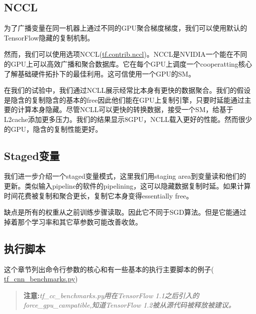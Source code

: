\subsection{NCCL}
为了广播变量在同一机器上通过不同的GPU聚合梯度梯度，我们可以使用默认的TensorFlow隐藏的复制机制。

然而，我们可以使用选项NCCL(\href{https://www.tensorflow.org/api_docs/python/tf/contrib/nccl}{tf.contrib.nccl})。NCCL是NVIDIA一个能在不同的GPU上可以高效广播和聚合数据库。它在每个GPU上调度一个cooperatting核心了解基础硬件拓扑下的最佳利用。这可信使用一个GPU的SM。

在我们的试验中，我们通过NCLL展示经常比本身有更快的数据聚合。我们的假设是隐含的复制隐含的基本的free因此他们能在GPU上复制引擎，只要时延能通过主要的计算本身隐藏。尽管NCLL可以更快的转换数据，接受一个SM，给基于L2cache添加更多压力。我们的结果显示8GPU，NCLL载入更好的性能。然而很少的GPU，隐含的复制性能更好。
\subsection{Staged变量}
我们进一步介绍一个staged变量模式，这里我们用staging area到变量读和他们的更新。类似输入pipeline的软件的pipelining，这可以隐藏数据复制时延。如果计算时间花费被复制和聚合更长，复制它本身变得essentially free。

缺点是所有的权重从之前训练步骤读取。因此它不同于SGD算法。但是它能通过掉着那个学习率和其它草参数可能改善收敛。

\subsection{执行脚本}
这个章节列出命令行参数的核心和有一些基本的执行主要脚本的例子( \href{https://github.com/tensorflow/benchmarks/tree/master/scripts/tf_cnn_benchmarks/tf_cnn_benchmarks.py}{tf\_cnn\_benchmarks.py})
\begin{quote}
	\textbf{注意:}\emph{tf\_cc\_benchmarks.py用在TensorFlow 1.1之后引入的force\_gpu\_campatible,知道TensorFlow 1.2被从源代码被释放被建议。}
\end{quote}

